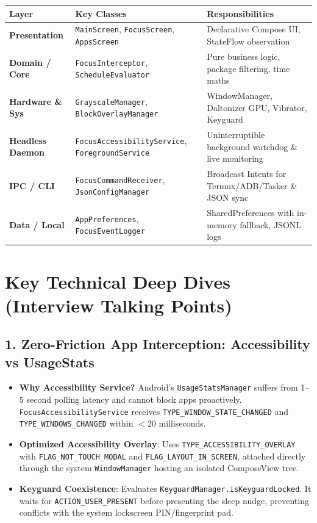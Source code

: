 \documentclass[11pt,a4paper]{article}
\begin{document}
\begin{center}
\begin{tabular}{lll}
\toprule
\textbf{Layer} & \textbf{Key Classes} & \textbf{Responsibilities} \\
\midrule
\textbf{Presentation} & \texttt{MainScreen}, \texttt{FocusScreen}, \texttt{AppsScreen} & Declarative Compose UI, StateFlow observation \\
\textbf{Domain / Core} & \texttt{FocusInterceptor}, \texttt{ScheduleEvaluator} & Pure business logic, package filtering, time maths \\
\textbf{Hardware \& Sys} & \texttt{GrayscaleManager}, \texttt{BlockOverlayManager} & WindowManager, Daltonizer GPU, Vibrator, Keyguard \\
\textbf{Headless Daemon} & \texttt{FocusAccessibilityService}, \texttt{ForegroundService} & Uninterruptible background watchdog \& live monitoring \\
\textbf{IPC / CLI} & \texttt{FocusCommandReceiver}, \texttt{JsonConfigManager} & Broadcast Intents for Termux/ADB/Tasker \& JSON sync \\
\textbf{Data / Local} & \texttt{AppPreferences}, \texttt{FocusEventLogger} & SharedPreferences with in-memory fallback, JSONL logs \\
\bottomrule
\end{tabular}
\end{center}

\section{Key Technical Deep Dives (Interview Talking Points)}

\subsection{1. Zero-Friction App Interception: Accessibility vs UsageStats}
\begin{itemize}
    \item \textbf{Why Accessibility Service?} Android's \texttt{UsageStatsManager} suffers from 1--5 second polling latency and cannot block apps proactively. \texttt{FocusAccessibilityService} receives \texttt{TYPE\_WINDOW\_STATE\_CHANGED} and \texttt{TYPE\_WINDOWS\_CHANGED} within $<20$ milliseconds.
    \item \textbf{Optimized Accessibility Overlay}: Uses \texttt{TYPE\_ACCESSIBILITY\_OVERLAY} with \texttt{FLAG\_NOT\_TOUCH\_MODAL} and \texttt{FLAG\_LAYOUT\_IN\_SCREEN}, attached directly through the system \texttt{WindowManager} hosting an isolated ComposeView tree.
    \item \textbf{Keyguard Coexistence}: Evaluates \texttt{KeyguardManager.isKeyguardLocked}. It waits for \texttt{ACTION\_USER\_PRESENT} before presenting the sleep nudge, preventing conflicts with the system lockscreen PIN/fingerprint pad.
\end{itemize}
\end{document}
